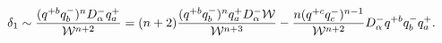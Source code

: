 \begin{equation}\label{ident} \delta_{1}\sim
\frac{(q^{+b}q^-_b)^nD^-_{\alpha}q^+_a}{{\cal
W}^{n+2}}=(n+2)\frac{(q^{+b}q^-_b)^nq^+_a D^-_{\alpha}{\cal W
}}{{\cal W}^{n+3}}-\frac{n(q^{+c}q^-_c)^{n-1}}{{\cal
W}^{n+2}}D^-_{\alpha}q^{+b}q^-_b q^+_a.
\end{equation}

